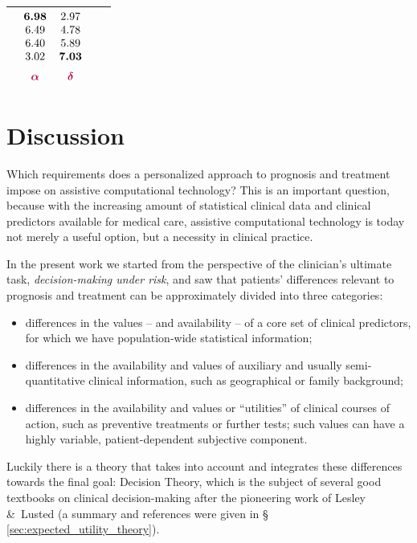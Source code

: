 \documentclass[a4paper,12pt,%
onecolumn,oneside,article,%
british%
]{memoir}
\theoremstyle{remark}
\theoremstyle{innote}
\newcommand*{\citey}{\cites*}
\newcommand*{\amp}{\&}
\renewcommand*{\|}[1][]{\nonscript\:#1\vert\nonscript\:\mathopen{}}
\newcommand*{\sect}{\S}%
\begin{document}
\begin{table}
\begin{tabularx}{\linewidth}{Xcccc}
    &
    $\begin{matrix}\bm{6.98}\\6.49\\6.40\\3.02\\[2\jot]\color{purple}\bm{\alpha}\end{matrix}$
    &
    $\begin{matrix}2.97\\4.78\\5.89\\\bm{7.03}\\[2\jot]\color{purple}\bm{\delta}\end{matrix}$
    \\[7\jot]
    \hline
  \end{tabularx}
\end{table}



\bigskip%
\section{Discussion}
\label{sec:discussion}

Which requirements does a personalized approach to prognosis and treatment impose on assistive computational technology? This is an important question, because with the increasing amount of statistical clinical data and clinical predictors available for medical care, assistive computational technology is today not merely a useful option, but a necessity in clinical practice.

In the present work we started from the perspective of the clinician's ultimate task, \emph{decision-making under risk}, and saw that patients' differences relevant to prognosis and treatment can be approximately divided into three categories:
\begin{itemize}
\item\label{item:diff_corepredictors} differences in the values -- and availability -- of a core set of clinical predictors, for which we have population-wide statistical information;
\item\label{item:diff_priorinfo} differences in the availability and values of auxiliary and usually semi-quantitative clinical information, such as geographical or family background;
\item\label{item:diff_utility} differences in the availability and values or \enquote{utilities} of clinical courses of action, such as preventive treatments or further tests; such values can have a highly variable, patient-dependent subjective component.
\end{itemize}
Luckily there is a theory that takes into account and integrates these differences towards the final goal: Decision Theory, which is the subject of several good textbooks on clinical decision-making \autocites{weinsteinetal1980,soxetal1988_r2013,huninketal2001_r2014} after the pioneering work of Lesley \amp\ Lusted \citey{ledleyetal1959,ledleyetal1959b,ledleyetal1960,lustedetal1960,lusted1968} (a summary and references were given in \sect\,\ref{sec:expected_utility_theory}).
\end{document}
